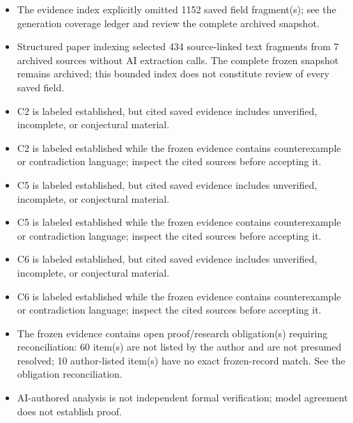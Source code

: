 \documentclass[11pt]{article}
\begin{document}
\begin{itemize}
\item The evidence index explicitly omitted 1152 saved field fragment(s); see the generation coverage ledger and review the complete archived snapshot.
\item Structured paper indexing selected 434 source-linked text fragments from 7 archived sources without AI extraction calls. The complete frozen snapshot remains archived; this bounded index does not constitute review of every saved field.
\item C2 is labeled established, but cited saved evidence includes unverified, incomplete, or conjectural material.
\item C2 is labeled established while the frozen evidence contains counterexample or contradiction language; inspect the cited sources before accepting it.
\item C5 is labeled established, but cited saved evidence includes unverified, incomplete, or conjectural material.
\item C5 is labeled established while the frozen evidence contains counterexample or contradiction language; inspect the cited sources before accepting it.
\item C6 is labeled established, but cited saved evidence includes unverified, incomplete, or conjectural material.
\item C6 is labeled established while the frozen evidence contains counterexample or contradiction language; inspect the cited sources before accepting it.
\item The frozen evidence contains open proof/research obligation(s) requiring reconciliation: 60 item(s) are not listed by the author and are not presumed resolved; 10 author-listed item(s) have no exact frozen-record match. See the obligation reconciliation.
\item AI-authored analysis is not independent formal verification; model agreement does not establish proof.
\end{itemize}
\end{document}
